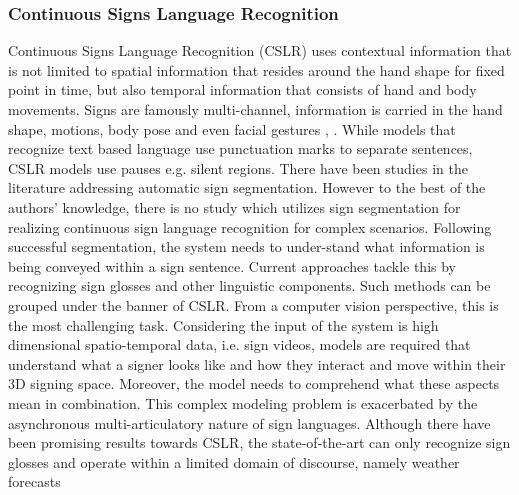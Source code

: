 \subsubsection{Continuous Signs Language Recognition}
Continuous Signs Language Recognition (CSLR) uses contextual information that is not limited to spatial information that resides around the hand shape for fixed point in time, but also temporal information that consists of hand and body movements. Signs are famously multi-channel, information is carried in the hand shape, motions, body pose and even facial gestures \cite{slimane2021context}, \cite{camgoz2017subunets}. While models that recognize text based language use punctuation marks to separate sentences, CSLR models use pauses e.g. silent regions. There have been studies in the literature addressing automatic sign segmentation. However to the best of the authors’ knowledge, there is no study which utilizes sign segmentation for realizing continuous sign language recognition for complex scenarios. Following successful segmentation, the system needs to under-stand what information is being conveyed within a sign sentence. Current approaches tackle this by recognizing sign glosses and other linguistic components. Such methods can be grouped under the banner of CSLR. From a computer vision perspective, this is the most challenging task. Considering the input of the system is high dimensional spatio-temporal data, i.e. sign videos, models are required that understand what a signer looks like and how they interact and move within their 3D signing space. Moreover, the model needs to comprehend what these aspects mean in combination. This complex modeling problem is exacerbated by the asynchronous multi-articulatory nature of sign languages. Although there have been promising results towards CSLR, the state-of-the-art can only recognize sign glosses and operate within a limited domain of discourse, namely weather forecasts \cite{camgoz2020sign}

